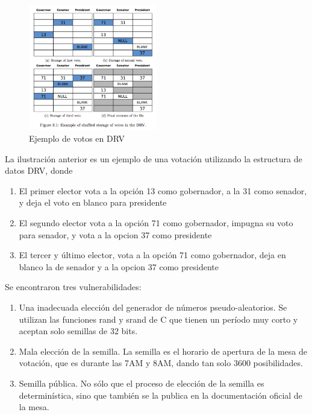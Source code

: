 \begin{figure}[h!]
\includegraphics[width=0.5\textwidth]{Imagenes/privacidad1}
\caption{Ejemplo de votos en DRV}
\end{figure}

La ilustración anterior es un ejemplo de una votación utilizando la estructura de datos DRV, donde
\begin{enumerate}
	\item El primer elector vota a la opción 13 como gobernador, a la 31 como senador, y deja el voto en blanco para presidente
	\item El segundo elector vota a la opción 71 como gobernador, impugna su voto para senador, y vota a la opcion 37 como presidente
	\item El tercer y último elector, vota a la opción 71 como gobernador, deja en blanco la de senador y a la opcion 37 como presidente
\end{enumerate}

Se encontraron tres vulnerabilidades:
\begin{enumerate}
	\item Una inadecuada elección del generador de números pseudo-aleatorios. Se utilizan las funciones rand y srand de C que tienen un período muy corto y aceptan solo semillas de 32 bits.
	\item Mala elección de la semilla. La semilla es el horario de apertura de la mesa de votación, que es durante las 7AM y 8AM, dando tan solo 3600 posibilidades.
	\item Semilla pública. No sólo que el proceso de elección de la semilla es determinística, sino que también se la publica en la documentación oficial de la mesa.
\end{enumerate}

